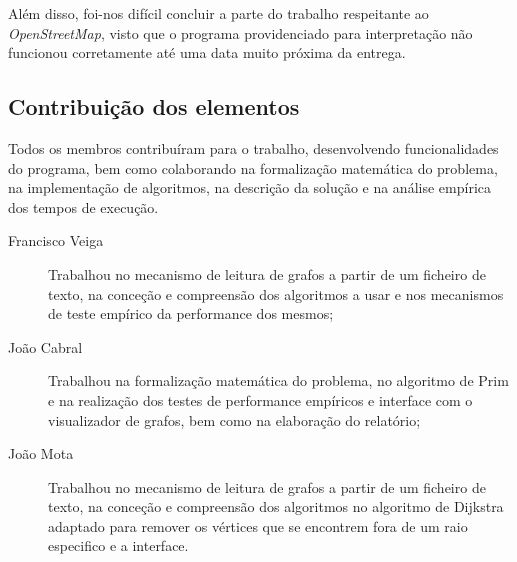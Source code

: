 \documentclass[a4paper,12pt,titlepage]{article}
\begin{document}
Além disso, foi-nos difícil concluir a parte do trabalho respeitante ao \emph{OpenStreetMap}, visto que o programa providenciado para interpretação não funcionou corretamente até uma data muito próxima da entrega.
\subsection{Contribuição dos elementos}
Todos os membros contribuíram para o trabalho, desenvolvendo funcionalidades do programa, bem como colaborando na formalização matemática do problema, na implementação de algoritmos, na descrição da solução e na análise empírica dos tempos de execução.
\begin{description}
\item[Francisco Veiga] Trabalhou no mecanismo de leitura de grafos a partir de um ficheiro de texto, na conceção e compreensão dos algoritmos a usar e nos mecanismos de teste empírico da performance dos mesmos;
\item[João Cabral] Trabalhou na formalização matemática do problema, no algoritmo de Prim e na realização dos testes de performance empíricos e interface com o visualizador de grafos, bem como na elaboração do relatório;
\item[João Mota] Trabalhou no mecanismo de leitura de grafos a partir de um ficheiro de texto, na conceção e compreensão dos algoritmos no algoritmo de Dijkstra adaptado para remover os vértices que se encontrem fora de um raio especifico e a interface.


\end{description}

\newpage


\end{document}

